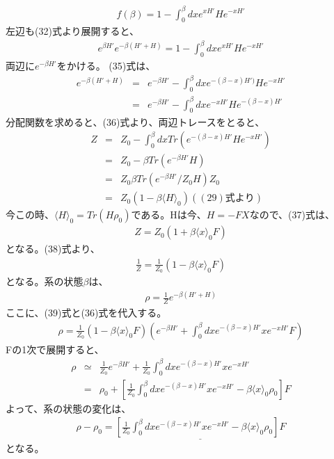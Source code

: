 \documentclass[10pt]{jreport}
\begin{document}
\begin{eqnarray}
f(\beta)=1-\int^\beta_0 dx e^{xH'}He^{-xH'}
\end{eqnarray}
左辺も(32)式より展開すると、
\begin{eqnarray}
e^{\beta H'}e^{-\beta(H'+H)}=1-\int^\beta_0 dx e^{xH'}He^{-xH'} 
\end{eqnarray}
両辺に$e^{-\beta H'}$をかける。
(35)式は、
\begin{eqnarray}
e^{-\beta (H'+H)}&=& e^{-\beta H'}-\int^\beta_0 dx e^{-(\beta-x)H')} H e^{-xH'} \nonumber \\
&=& e^{-\beta H'}-\int ^\beta _0 dx e^{-xH'}H e^{-(\beta-x)H'}
\end{eqnarray}
分配関数を求めると、(36)式より、両辺トレースをとると、
\begin{eqnarray}
Z&=&Z_0 - \int^\beta_0 dx Tr (e^{-(\beta-x)H'}H e^{-xH'}) \nonumber \\
&=&Z_0 -\beta Tr(e^{-\beta H'}H) \nonumber \\
&=& Z_0 \beta Tr (e^{-\beta H'}/Z_0 H)Z_0 \nonumber \\
&=& Z_0(1-\beta \langle H \rangle_0) {   }((29)式より)
\end{eqnarray}
今この時、$\langle H \rangle _0 =Tr(H\rho_0)$である。Hは今、$H=-FX$なので、(37)式は、
\begin{eqnarray}
Z=Z_0(1+\beta \langle x \rangle_0 F )
\end{eqnarray}
となる。(38)式より、
\begin{eqnarray}
\frac{1}{Z} = \frac{1}{Z_0}(1-\beta \langle x \rangle_0 F)
\end{eqnarray}
となる。系の状態$\beta$は、
\begin{eqnarray}
\rho =\frac{1}{Z}e^{-\beta (H'+H)}
\end{eqnarray}
ここに、(39)式と(36)式を代入する。
\begin{eqnarray}
\rho=\frac{1}{Z_0}(1-\beta \langle x \rangle _0 F)(e^{-\beta H'}+\int^\beta_0 dx e^{-(\beta-x)H'}xe^{-xH'}F)
\end{eqnarray}
Fの1次で展開すると、
\begin{eqnarray}
\rho &\simeq& \frac{1}{Z_0} e^{-\beta H'}+\frac{1}{Z_0} \int^\beta_0 dx e^{-(\beta-x)H'}xe^{-xH'} \nonumber \\
&=& \rho_0+[\frac{1}{Z_0}\int^\beta_0 dx e^{-(\beta-x)H'}xe^{-xH'}-\beta \langle x \rangle_0 \rho_0 ]F 
\end{eqnarray}
よって、系の状態の変化は、
\begin{eqnarray}
\rho-\rho_0 =\underline{[\frac{1}{Z_0}\int^\beta_0dx e^{-(\beta-x)H'}xe^{-xH'}-\beta\langle x\rangle_0 \rho_0]F}
\end{eqnarray}
となる。
\end{document}
